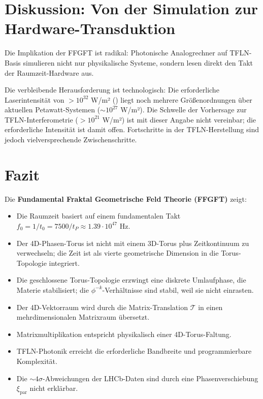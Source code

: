 	\section{Diskussion: Von der Simulation zur Hardware-Transduktion}
	
	Die Implikation der FFGFT ist radikal: Photonische Analogrechner auf TFLN-Basis simulieren nicht nur physikalische Systeme, sondern lesen direkt den Takt der Raumzeit-Hardware aus.
	
	Die verbleibende Herausforderung ist technologisch: Die erforderliche Laserintensität von $>10^{32}$ W/m² (\cite{subPlanck2025}) liegt noch mehrere Größenordnungen über aktuellen Petawatt-Systemen ($\sim 10^{27}$ W/m²). Die Schwelle der Vorhersage zur TFLN-Interferometrie ($>10^{21}$ W/m²) ist mit dieser Angabe nicht vereinbar; die erforderliche Intensität ist damit offen. Fortschritte in der TFLN-Herstellung sind jedoch vielversprechende Zwischenschritte.
	
	\section{Fazit}
	
	Die \textbf{Fundamental Fraktal Geometrische Feld Theorie (FFGFT)} zeigt:
	
	\begin{itemize}
		\item Die Raumzeit basiert auf einem fundamentalen Takt $f_0 = 1/t_0 = 7500/t_P \approx 1.39 \cdot 10^{47}$ Hz.
		\item Der 4D-Phasen-Torus ist nicht mit einem 3D-Torus plus Zeitkontinuum zu verwechseln; die Zeit ist als vierte geometrische Dimension in die Torus-Topologie integriert.
		\item Die geschlossene Torus-Topologie erzwingt eine diskrete Umlaufphase, die Materie stabilisiert; die $\phi^{-k}$-Verhältnisse sind stabil, weil sie nicht einrasten.
		\item Der 4D-Vektorraum wird durch die Matrix-Translation $\mathcal{T}$ in einen mehrdimensionalen Matrixraum übersetzt.
		\item Matrixmultiplikation entspricht physikalisch einer 4D-Torus-Faltung.
		\item TFLN-Photonik erreicht die erforderliche Bandbreite und programmierbare Komplexität.
		\item Die $\sim 4\sigma$-Abweichungen der LHCb-Daten sind durch eine Phasenverschiebung $\xi_{\text{par}}$ nicht erklärbar.
	\end{itemize}
	
